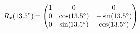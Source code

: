 \documentclass[preview]{standalone}
\begin{document}
\begin{align*}
\special{dvisvgm:raw <g id='unique000'>}R_x(13.5^\circ) = \begin{pmatrix} 1 & 0 & 0 \\ 0 & \cos(13.5^\circ) & -\sin(13.5^\circ) \\ 0 & \sin(13.5^\circ) & \cos(13.5^\circ) \end{pmatrix}\special{dvisvgm:raw </g>}
\end{align*}
\end{document}
